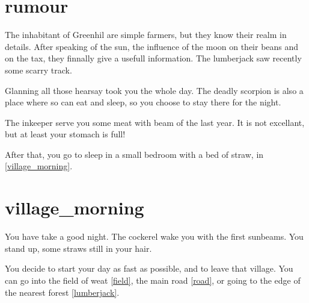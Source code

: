 \section{rumour}

The inhabitant of Greenhil are simple farmers, but they know their realm in
details. After speaking of the sun, the influence of the moon on their beans and
on the tax, they finnally give a usefull information. The lumberjack saw
recently some scarry track.

Glanning all those hearsay took you the whole day. The deadly scorpion is also a
place where so can eat and sleep, so you choose to stay there for the night.

The inkeeper serve you some meat with beam of the last year. It is not
excellant, but at least your stomach is full!

After that, you go to sleep in a small bedroom with a bed of straw, in
\ref{village_morning}.

\section{village_morning}

You have take a good night. The cockerel wake you with the first sunbeams. You
stand up, some straws still in your hair.

You decide to start your day as fast as possible, and to leave that village.
You can go into the field of weat \ref{field}, the main road \ref{road}, or
going to the edge of the nearest forest \ref{lumberjack}. %

